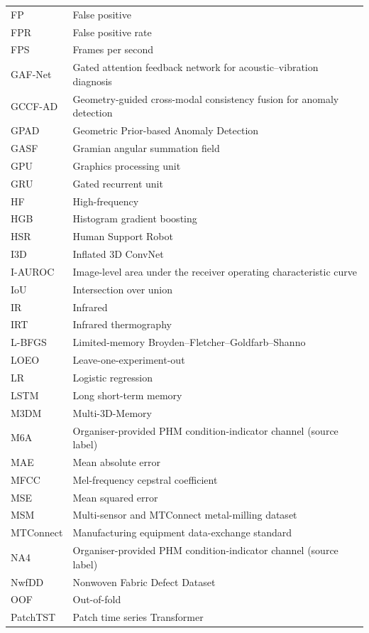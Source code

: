 \begin{longtable}{@{}P{.20\textwidth}P{.74\textwidth}@{}}
FP & False positive \\
FPR & False positive rate \\
FPS & Frames per second \\
GAF-Net & Gated attention feedback network for acoustic--vibration diagnosis \\
GCCF-AD & Geometry-guided cross-modal consistency fusion for anomaly detection \\
GPAD & Geometric Prior-based Anomaly Detection \\
GASF & Gramian angular summation field \\
GPU & Graphics processing unit \\
GRU & Gated recurrent unit \\
HF & High-frequency \\
HGB & Histogram gradient boosting \\
HSR & Human Support Robot \\
I3D & Inflated 3D ConvNet \\
I-AUROC & Image-level area under the receiver operating characteristic curve \\
IoU & Intersection over union \\
IR & Infrared \\
IRT & Infrared thermography \\
L-BFGS & Limited-memory Broyden--Fletcher--Goldfarb--Shanno \\
LOEO & Leave-one-experiment-out \\
LR & Logistic regression \\
LSTM & Long short-term memory \\
M3DM & Multi-3D-Memory \\
M6A & Organiser-provided PHM condition-indicator channel (source label) \\
MAE & Mean absolute error \\
MFCC & Mel-frequency cepstral coefficient \\
MSE & Mean squared error \\
MSM & Multi-sensor and MTConnect metal-milling dataset \\
MTConnect & Manufacturing equipment data-exchange standard \\
NA4 & Organiser-provided PHM condition-indicator channel (source label) \\
NwfDD & Nonwoven Fabric Defect Dataset \\
OOF & Out-of-fold \\
PatchTST & Patch time series Transformer \\

\end{longtable}
